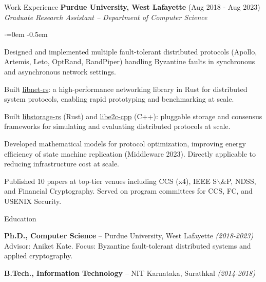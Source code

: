 \documentclass{resume}
\begin{document}
\begin{rSection}{Work Experience}
\textbf{Purdue University, West Lafayette}  \hfill  (Aug 2018 - Aug 2023)\\
\emph{Graduate Research Assistant -- Department of Computer Science}
\begin{list}{$\cdot$}{\leftmargin=0em}
\itemsep -0.5em \vspace{-0.5em}
 \item  Designed and implemented multiple fault-tolerant distributed protocols (Apollo, Artemis, Leto, OptRand, RandPiper) handling Byzantine faults in synchronous and asynchronous network settings.
 \item  Built \href{https://github.com/libdist-rs/libnet-rs}{libnet-rs}: a high-performance networking library in Rust for distributed system protocols, enabling rapid prototyping and benchmarking at scale.
 \item  Built \href{https://github.com/libdist-rs/libstorage-rs}{libstorage-rs} (Rust) and \href{https://github.com/adithyabhatkajake/libe2c-cpp}{libe2c-cpp} (C++): pluggable storage and consensus frameworks for simulating and evaluating distributed protocols at scale.
 \item  Developed mathematical models for protocol optimization, improving energy efficiency of state machine replication (Middleware 2023). Directly applicable to reducing infrastructure cost at scale.
 \item  Published 10 papers at top-tier venues including CCS (x4), IEEE S$\backslash$&P, NDSS, and Financial Cryptography. Served on program committees for CCS, FC, and USENIX Security.
\end{list}
\vspace{0.5em}
\end{rSection}
\begin{rSection}{Education}
\label{sec:orgb3a9199}
 \item  \textbf{Ph.D., Computer Science} -- Purdue University, West Lafayette  \hfill  \emph{(2018-2023)}\\
    Advisor: Aniket Kate. Focus: Byzantine fault-tolerant distributed systems and applied cryptography.

 \item  \textbf{B.Tech., Information Technology} -- NIT Karnataka, Surathkal  \hfill  \emph{(2014-2018)}
\end{rSection}
\end{document}
